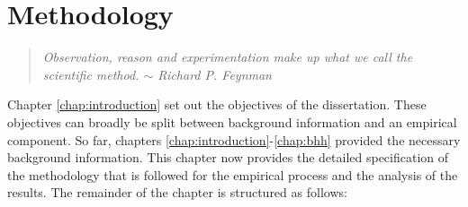 \chapter{Methodology}
\label{chap:methodology}

\begin{quote}
    \textit{Observation, reason and experimentation make up what we call the scientific method. $\sim$ Richard P. Feynman}
\end{quote}


Chapter \ref{chap:introduction} set out the objectives of the dissertation. These objectives can broadly be split between background information and an empirical component. So far, chapters \ref{chap:introduction}-\ref{chap:bhh} provided the necessary background information. This chapter now provides the detailed specification of the methodology that is followed for the empirical process and the analysis of the results. The remainder of the chapter is structured as follows: 

